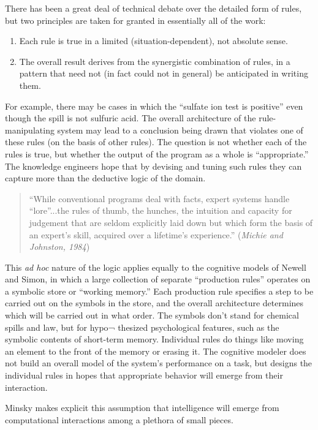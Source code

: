\documentclass[12pt]{article}
\def\bq{\begin{quote}}
\def\eq{\end{quote}}
\begin{document}
There has been a great deal of technical debate over the detailed form of rules, but two principles are taken for granted in essentially all of the work:

\begin{enumerate}
\item Each rule is true in a limited (situation-dependent), not absolute sense. 

\item The overall result derives from the synergistic combination of rules, in a pattern that need not (in fact could not in general) be anticipated in writing them.

\end{enumerate}

For example, there may be cases in which the ``sulfate ion test is positive'' even though the spill is not sulfuric acid. The overall architecture of the rule-manipulating system may lead to a conclusion being drawn that violates one of these rules (on the basis of other rules). The question is not whether each of the rules is true, but whether the output of the program as a whole is ``appropriate.'' The knowledge engineers hope that by devising and tuning such rules they can capture more than the deductive logic of the domain.

\bq
``While conventional programs deal with facts, expert systems handle ``lore''...the rules of thumb, the hunches, the intuition and capacity
for judgement that are seldom explicitly laid down but which form the basis of an expert’s skill, acquired over a lifetime's experience.'' ({\it Michie and Johnston, 1984})
\eq

This {\it ad hoc} nature of the logic applies equally to the cognitive models of Newell and Simon, in which a large collection of separate ``production rules'' operates on a symbolic store or ``working memory.'' Each production rule specifies a step to be carried out on the symbols in the store, and the overall architecture determines which will be carried out in what order. The symbols don’t stand for chemical spills and law, but for hypo¬ thesized psychological features, such as the symbolic contents of short-term memory. Individual rules do things like moving an element to the front of the memory or erasing it. The cognitive modeler does not build an overall model of the system's performance on a task, but designs the individual rules in hopes that appropriate behavior will emerge from their interaction.

Minsky makes explicit this assumption that intelligence will emerge from computational interactions among a plethora of small pieces.
\end{document}
